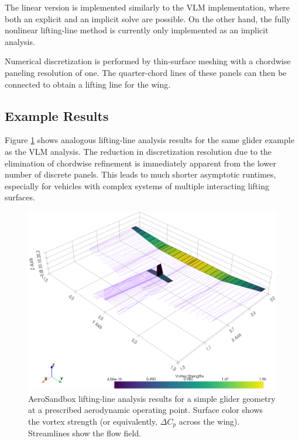 
The linear version is implemented similarly to the VLM implementation, where both an explicit and an implicit solve are possible. On the other hand, the fully nonlinear lifting-line method is currently only implemented as an implicit analysis.

Numerical discretization is performed by thin-surface meshing with a chordwise paneling resolution of one. The quarter-chord lines of these panels can then be connected to obtain a lifting line for the wing.

\subsection{Example Results}

Figure \ref{fig:ll} shows analogous lifting-line analysis results for the same glider example as the VLM analysis. The reduction in discretization resolution due to the elimination of chordwise refinement is immediately apparent from the lower number of discrete panels. This leads to much shorter asymptotic runtimes, especially for vehicles with complex systems of multiple interacting lifting surfaces.

\begin{figure}[h]
    \centering
    \includegraphics[width=\textwidth]{../figures/ll.png}
    \caption{AeroSandbox lifting-line analysis results for a simple glider geometry at a prescribed aerodynamic operating point. Surface color shows the vortex strength (or equivalently, $\Delta C_p$ across the wing). Streamlines show the flow field.}
    \label{fig:ll}
\end{figure}

